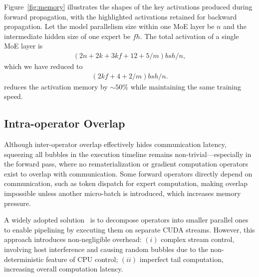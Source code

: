 Figure~\ref{fig:memory} illustrates the shapes of the key activations produced during forward propagation, with the highlighted activations retained for backward propagation.
Let the model parallelism size within one MoE layer be $n$ and the intermediate hidden size of one expert be $fh$. The total activation of a single MoE layer is 
\begin{align}
(2n+2k+3kf+12+5/m)bsh/n,
\nonumber
\end{align}
which we have reduced to 
\begin{align}
(2kf+4+2/m)bsh/n.
\nonumber
\end{align}
\sysname reduces the activation memory by $\sim 50\%$ while maintaining the same training speed.
 
\subsection{Intra-operator Overlap}
\label{sec:design:overlapping:intra-op}

Although inter-operator overlap effectively hides communication latency, squeezing all bubbles in the execution timeline remains non-trivial---especially in the forward pass, where no rematerialization or gradient computation operators exist to overlap with communication. Some forward operators directly depend on communication, such as token dispatch for expert computation, making overlap impossible unless another micro-batch is introduced, which increases memory pressure.

A widely adopted solution~\cite{jiang2024megascale, transformer-engine, wang2022overlap} is to decompose operators into smaller parallel ones to enable pipelining by executing them on separate CUDA streams. 
However, this approach introduces non-negligible overhead: $(i)$ complex stream control, involving host interference and causing random bubbles due to the non-deterministic feature of CPU control; $(ii)$ imperfect tail computation, increasing overall computation latency.

